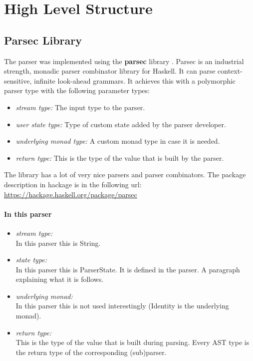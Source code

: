 \documentclass[diploma]{softlab-thesis}
\begin{document}
\newpage
\section{High Level Structure}

\subsection{Parsec Library}


The parser was implemented using the \textbf{parsec} library \cite{parsec}.
Parsec is an industrial strength, monadic parser combinator library for
Haskell.  It can parse context-sensitive, infinite look-ahead grammars. It
achieves this with a polymorphic parser type with the following parameter
types:

\begin{itemize}
\item
  \textit{stream type:} The input type to the parser.
\item
  \textit{user state type:} Type of custom state added by the parser developer.
\item
  \textit{underlying monad type:} A custom monad type in case it is needed.
\item
  \textit{return type:}
  This is the type of the value that is built by the parser.
\end{itemize}
The library has a lot of very nice parsers and parser combinators.
The package description in hackage is in the following url:
\url{https://hackage.haskell.org/package/parsec}

\paragraph{In this parser}
\begin{itemize}
\item
  \textit{stream type:}
  \\
  In this parser this is String.
\item
  \textit{state type:}
  \\
  In this parser this is ParserState. It is defined in the parser.
  A paragraph explaining what it is follows.
\item
  \textit{underlying monad:}
  \\
  In this parser this is not used interestingly
  (Identity is the underlying monad).
\item
  \textit{return type:}
  \\
  This is the type of the value that is built during parsing.
  Every AST type is the return type of the corresponding (sub)parser.
\end{itemize}
\end{document}
